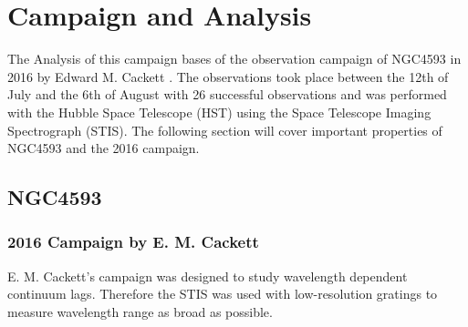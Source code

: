 \chapter{Campaign and Analysis}
\label{campaign_and_analysis}
The Analysis of this campaign bases of the observation campaign of NGC4593 in 2016 by Edward M. Cackett \cite{cackett2018accretion}. The observations took place between the 12th of July and the 6th of August with 26 successful observations and was performed with the Hubble Space Telescope (HST) using the Space Telescope Imaging Spectrograph (STIS). The following section will cover important properties of NGC4593 and the 2016 campaign.

\section{NGC4593}
\label{NGC4593}

\subsection{2016 Campaign by E. M. Cackett}
\label{Campaign_Cackett}

E. M. Cackett's campaign was designed to study wavelength dependent continuum lags. Therefore the STIS was used with low-resolution gratings to measure wavelength range as broad as possible. 